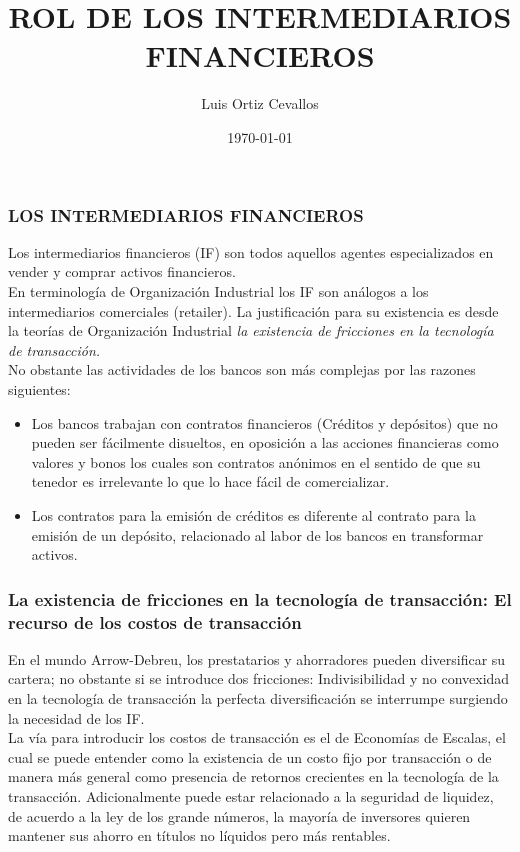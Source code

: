 \documentclass[10pt, xcolor=table, x11names]{beamer}
\title[]{ROL DE LOS INTERMEDIARIOS FINANCIEROS}
\author[Luis Ortiz]{Luis Ortiz Cevallos}
\institute[SECMCA]{\bf SECMCA}
\date[\today]{\footnotesize \today}
\begin{document}
\begin{frame}
\titlepage
\end{frame}




\begin{frame}
	\frametitle{{\normalsize LOS INTERMEDIARIOS FINANCIEROS} {}}
	
    Los intermediarios financieros (IF) son todos aquellos agentes especializados en vender y comprar activos financieros.\\
    En terminología de Organización Industrial los IF son análogos a los intermediarios comerciales (retailer). La justificación para su existencia es desde la teorías de Organización Industrial  \textit{la existencia de fricciones en la tecnología de transacción.}\\
    No obstante las actividades de los bancos son más complejas por las razones siguientes:
    \begin{itemize}
        \item Los bancos trabajan con contratos financieros (Créditos y depósitos) que no pueden ser fácilmente disueltos, en oposición a las acciones financieras como valores y bonos los cuales son contratos anónimos en el sentido de que su tenedor es irrelevante lo que lo hace fácil de comercializar.
        \item Los contratos para la emisión de créditos es diferente al contrato para la emisión de un depósito, relacionado al labor de los bancos en transformar activos. 
    \end{itemize} 
    
    
    	
\end{frame}

\begin{frame}
    \frametitle{{\normalsize La existencia de fricciones en la tecnología de transacción: El recurso de los costos de transacción} {}}
    
    En el mundo Arrow-Debreu, los prestatarios y ahorradores pueden diversificar su cartera; no obstante si se introduce dos fricciones: Indivisibilidad y no convexidad en la tecnología de transacción la perfecta diversificación se interrumpe surgiendo la necesidad de los IF.\\
    La vía para introducir los costos de transacción es el de Economías de Escalas, el cual se puede entender como la existencia de un costo fijo por transacción o de manera más general como presencia de retornos crecientes en la tecnología de la transacción. Adicionalmente puede estar relacionado a la seguridad de liquidez, de acuerdo a la ley de los grande números, la mayoría de inversores quieren mantener sus ahorro en títulos no líquidos pero más rentables.\\
    
    
    
    
    
    
    
    
\end{frame}
\end{document}
